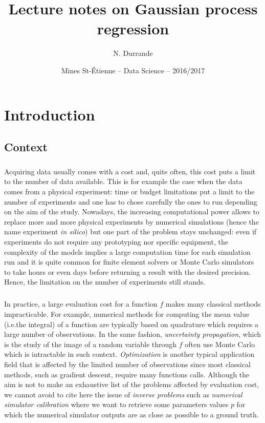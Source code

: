 \documentclass[twoside,openright]{report}
\author{N. Durrande}
\date{Mines St-\'Etienne -- Data Science -- 2016/2017}
\title{Lecture notes on Gaussian process regression}
\begin{document}
\maketitle	


\tableofcontents

\chapter*{Introduction}

\section*{Context}

\paragraph{}
Acquiring data usually comes with a cost and, quite often, this cost puts a limit to the number of data available. This is for example the case when the data comes from a physical experiment: time or budget limitations put a limit to the number of experiments and one has to chose carefully the ones to run depending on the aim of the study. Nowadays, the increasing computational power allows to replace more and more physical experiments by numerical simulations (hence the name experiment \emph{in silico}) but one part of the problem stays unchanged: even if experiments do not require any prototyping nor specific equipment, the complexity of the models implies a large computation time for each simulation run and it is quite common for finite element solvers or Monte Carlo simulators to take hours or even days before returning a result with the desired precision. Hence, the limitation on the number of experiments still stands.

\paragraph{}
In practice, a large evaluation cost for a function $f$ makes many classical methods impracticable. For example, numerical methods for computing the mean value (i.e.\@ the integral) of a function are typically based on quadrature which requires a large number of observations. In the same fashion, \emph{uncertainty propagation}, which is the study of the image of a random variable through $f$ often use Monte Carlo which is intractable in such context. \emph{Optimization} is another typical application field that is affected by the limited number of observations since most classical methods, such as gradient descent, require many functions calls. Although the aim is not to make an exhaustive list of the problems affected by evaluation cost, we cannot avoid to cite here the issue of \emph{inverse problems} such as \emph{numerical simulator calibration} where we want to retrieve some parameters values $p$ for which the numerical simulator outputs are as close as possible to a ground truth.
\end{document}
